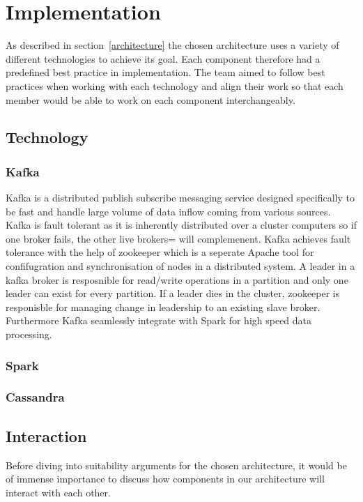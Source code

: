 \documentclass[prodmode,acmtosem]{acmsmall} %
\begin{document}

\section{Implementation}
As described in section~\ref{architecture} the chosen architecture uses a variety of different technologies to achieve its goal. Each component therefore had a predefined best practice in implementation. The team aimed to follow best practices when working with each technology and align their work so that each member would be able to work on each component interchangeably.

\subsection{Technology}

\subsubsection{Kafka}
Kafka is a distributed publish subscribe messaging service designed specifically to be fast and handle large volume of data inflow coming from various sources. Kafka is fault tolerant as it is inherently distributed over a cluster computers so if one broker fails, the other live brokers= will complemenent. Kafka achieves fault tolerance with the help of zookeeper which is a seperate Apache tool for confifugration and synchronisation of nodes in a distributed system. A leader in a kafka broker is resposnible for read/write operations in a partition and only one leader can exist for every partition. If a leader dies in the cluster, zookeeper is responisble for managing change in leadership to an existing slave broker. Furthermore Kafka seamlessly integrate with Spark for high speed data processing. 
\subsubsection{Spark}
\subsubsection{Cassandra}

\subsection{Interaction}
Before diving into suitability arguments for the chosen architecture, it would be of immense importance to discuss how components in our architecture will interact with each other. 
\end{document}
